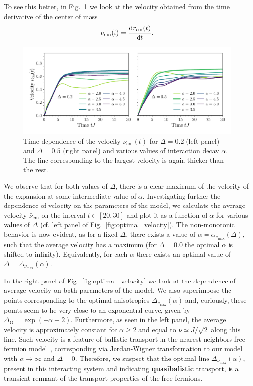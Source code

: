 To see this better, in Fig.~\ref{fig:velocity} we look at the velocity
obtained from the time derivative of the center of mass
\begin{equation}
  {\nu}_{\text{cm}}(t) = \dv{r_{\text{cm}}(t)}{t}.
  \label{eq:velocity}
\end{equation}
\begin{figure}[htbp]
  \centering
  \includegraphics[width=0.95\linewidth]{Figures/velocity.pdf}
  \caption{Time dependence of the velocity \(\nu_{\text{cm}}(t)\) for \(\Delta = 0.2\) (left panel) and \(\Delta = 0.5\)
    (right panel) and various values of interaction decay \(\alpha\). The line corresponding to the largest velocity
    is again thicker than the rest.}
  \label{fig:velocity}
\end{figure}
\noindent We observe that for both values of \(\Delta\), there is a clear maximum of the velocity of the expansion
at some intermediate value of \(\alpha\). Investigating further the dependence of velocity on the parameters
of the model, we calculate the average velocity \(\bar{\nu}_{\text{cm}}\) on the interval \(t\in\left[20,30\right]\)
and plot it as a function of \(\alpha\) for various values of \(\Delta\)
(cf. left panel of Fig.~\ref{fig:optimal_velocity}).
The non-monotonic behavior is now evident, as for a fixed \(\Delta\), there exists a value of
\( \alpha = \alpha_{\nu_{\mathrm{max}}}(\Delta) \),
such that the average velocity has a maximum (for \(\Delta = 0.0\) the optimal \(\alpha\) is shifted to infinity).
Equivalently, for each \(\alpha\) there exists an optimal value of \(\Delta = \Delta_{\nu_{\mathrm{max}}} (\alpha)\).

In the right panel of Fig.~\ref{fig:optimal_velocity} we look at the dependence of average velocity on both
parameters of the model. We also superimpose the points corresponding to the
optimal anisotropies \(\Delta_{\nu_{\mathrm{max}}} (\alpha)\) and, curiously, these points
seem to lie very close to an exponential curve, given by \(\Delta_{\mathrm{O}} = \exp\left(-\alpha + 2\right)\).
Furthermore, as seen in the left panel, the average velocity is approximately constant for \(\alpha \geq 2\) and equal to
\(\bar{\nu} \simeq J/\sqrt{2}\) along this line. Such velocity is a feature of ballistic
transport in the nearest neighbors free-fermion model~\autocite{Vidmar2013, Langer2012},
corresponding via Jordan-Wigner transformation to our model with \(\alpha \to \infty\) and \(\Delta = 0\).
Therefore, we suspect that the optimal line \(\Delta_{\nu_{\mathrm{max}}} (\alpha)\), present in this interacting
system and indicating \textbf{quasibalistic} transport, is a transient remnant of the transport properties of the free fermions.


